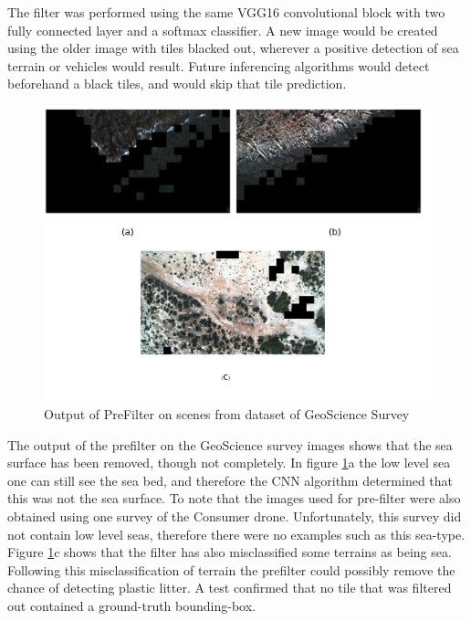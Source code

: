 \documentclass{IEEEtran}
\begin{document}
The filter was performed using the same VGG16 convolutional block with two fully connected layer and a softmax classifier. A new image would be created using the older image with tiles blacked out, wherever a positive detection of sea terrain or vehicles would result. Future inferencing algorithms would detect beforehand a black tiles, and would skip that tile prediction.

\begin{figure}[H]
\centering
\includegraphics[scale=0.5]{images/filter-geo.png}
\caption{Output of PreFilter on scenes from dataset of GeoScience Survey}
\label{fig:prefiltergeo}
\end{figure}

The output of the prefilter on the GeoScience survey images shows that the sea surface has been removed, though not completely. In figure \ref{fig:prefiltergeo}a the low level sea one can still see the sea bed, and therefore the CNN algorithm determined that this was not the sea surface. To note that the images used for pre-filter were also obtained using one survey of the Consumer drone. Unfortunately, this survey did not contain low level seas, therefore there were no examples such as this sea-type. Figure \ref{fig:prefiltergeo}c shows that the filter has also misclassified some terrains as being sea. Following this misclassification of terrain the prefilter could possibly remove the chance of detecting plastic litter. A test confirmed that no tile that was filtered out contained a ground-truth bounding-box. 
\end{document}
